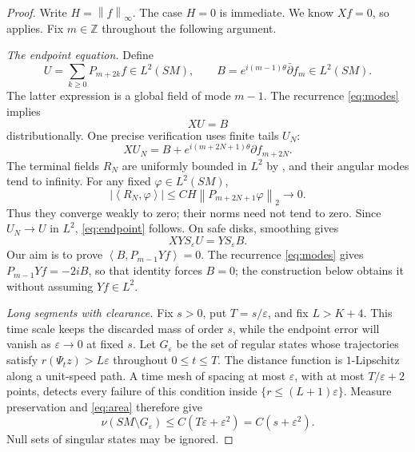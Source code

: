 \documentclass[11pt]{article}
\theoremstyle{remark}
\newcommand{\Z}{\mathbb Z}
\newcommand{\eps}{\varepsilon}
\newcommand{\pa}{\partial}
\newcommand{\pb}{\bar\partial}
\newcommand{\norm}[1]{\left\lVert#1\right\rVert}
\newcommand{\ip}[2]{\left\langle#1,#2\right\rangle}
\begin{document}
\begin{proof}
Write \(H=\norm{f}_\infty\). The case \(H=0\) is immediate.
We know \(Xf=0\), so  applies.
Fix \(m\in\Z\) throughout the following argument.

\medskip\noindent\emph{The endpoint equation.}
Define
\begin{equation}\label{eq:tail}
 U=\sum_{k\ge0}P_{m+2k}f\in L^2(SM),\qquad
 B=e^{i(m-1)\theta}\pb f_m\in L^2(SM).
\end{equation}
The latter expression is a global field of mode \(m-1\).
The recurrence \eqref{eq:modes} implies
\begin{equation}\label{eq:endpoint}
 XU=B
\end{equation}
distributionally. One precise verification uses finite tails \(U_N\):
\[
 XU_N=B+e^{i(m+2N+1)\theta}\pa f_{m+2N}.
\]
The terminal fields \(R_N\) are uniformly bounded in \(L^2\) by
, and their angular modes tend to infinity.
For any fixed \(\varphi\in L^2(SM)\),
\[
 |\ip{R_N}{\varphi}|
 \le CH\norm{P_{m+2N+1}\varphi}_2\longrightarrow0.
\]
Thus they converge weakly to zero; their norms need not tend to zero.
Since
\(U_N\to U\) in \(L^2\), \eqref{eq:endpoint} follows.
On safe disks, smoothing gives
\begin{equation}\label{eq:smoothed-equation}
 X Y S_\eps U=Y S_\eps B.
\end{equation}
Our aim is to prove \(\ip{B}{P_{m-1}Yf}=0\). The recurrence
\eqref{eq:modes} gives \(P_{m-1}Yf=-2iB\), so that identity forces
\(B=0\); the construction below obtains it without assuming
\(Yf\in L^2\).

\medskip\noindent\emph{Long segments with clearance.}
Fix \(s>0\), put \(T=s/\eps\), and fix \(L>K+4\).
This time scale keeps the discarded mass of order \(s\), while the
endpoint error will vanish as \(\eps\to0\) at fixed \(s\).
Let \(G_\eps\) be the set of regular states whose trajectories satisfy
\(r(\Psi_t z)>L\eps\) throughout \(0\le t\le T\).
The distance function is \(1\)-Lipschitz along a unit-speed path.
A time mesh of spacing at most \(\eps\), with at most
\(T/\eps+2\) points, detects every failure of this condition inside
\(\{r\le(L+1)\eps\}\). Measure preservation and \eqref{eq:area}
therefore give
\begin{equation}\label{eq:bad-measure}
 \nu(SM\setminus G_\eps)\le C(T\eps+\eps^2)
                                  =C(s+\eps^2).
\end{equation}
Null sets of singular states may be ignored.


\end{proof}
\end{document}
